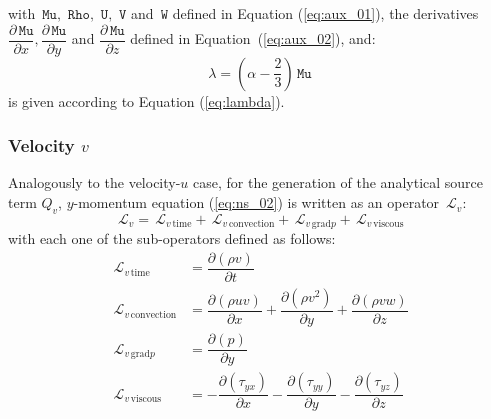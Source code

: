 \documentclass[10pt]{article}
\newcommand{\Diff}[2] {\dfrac{\partial( #1)}{\partial #2}}
\newcommand{\diff}[2] {\dfrac{\partial #1}{\partial #2}}
\newcommand{\Rho}{\,\mathtt{Rho}}
\newcommand{\U}{\,\mathtt{U}}
\newcommand{\V}{\,\mathtt{V}}
\newcommand{\W}{\,\mathtt{W}}
\newcommand{\Lo}{\,\mathcal{L}}
\newcommand{\Mu}{\,\mathtt{Mu}}
\newcommand{\DMuDx}{\diff{\Mu}{x}}
\newcommand{\DMuDy}{\diff{\Mu}{y}}
\newcommand{\DMuDz}{\diff{\Mu}{z}}
\newcommand{\convection}{\text{convection}}
\newcommand{\gradp}{\text{grad}p}
\newcommand{\viscous}{\text{viscous}}
\begin{document}
with $\Mu,\, \Rho,\,\U,\,\V$ and $\W$  defined in Equation (\ref{eq:aux_01}), the derivatives $\DMuDx,\DMuDy$ and $\DMuDz$ defined in Equation~(\ref{eq:aux_02}), and:
\begin{equation}\label{eq:lambda02}
 \lambda=\left( \alpha -\dfrac{2}{3} \right)\Mu   
\end{equation}
is given according to Equation (\ref{eq:lambda}).


\subsubsection{Velocity $v$}
Analogously to the velocity-$u$ case, for the generation of the analytical source term $Q_v$, $y$-momentum equation (\ref{eq:ns_02}) is written as an operator $\Lo_v$:
 $$\Lo_v = \Lo_{v \, \text{time}}+\Lo_{v \, \convection}+\Lo_{v \, \gradp }+\Lo_{v \, \viscous }$$
with each one of the sub-operators defined as follows:
\begin{equation*}
 \begin{split}
\Lo_{v \, \text{time}}&= \Diff{\rho v}{t} \\
\Lo_{v \, \convection}&= \Diff{\rho uv }{x}+\Diff{\rho v^2}{y} +\Diff{\rho vw}{z}\\
\Lo_{v \, \gradp }&= \Diff{p}{y}\\
\Lo_{v \, \viscous }&= -\Diff{\tau_{yx}}{x}-\Diff{\tau_{yy}}{y}-\Diff{\tau_{yz}}{z}
 \end{split}
\end{equation*}
\end{document}
